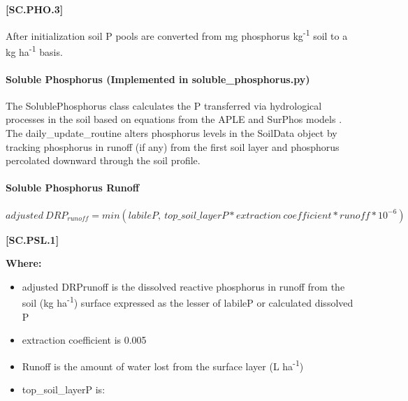             {\raggedleft \textbf{[SC.PHO.3]}\par}
            \vspace{0.5cm}

After initialization soil P pools are converted from mg phosphorus kg\textsuperscript{-1} soil to a kg ha\textsuperscript{-1} basis.

\paragraph{Soluble Phosphorus (Implemented in soluble\_phosphorus.py)}

The SolublePhosphorus class calculates the P transferred via hydrological processes in the soil based on equations from the APLE and SurPhos models \parencite{vadas2007}. The daily\_update\_routine alters phosphorus levels in the SoilData object by tracking phosphorus in runoff (if any) from the first soil layer and phosphorus percolated downward through the soil profile.
\vspace{0.2cm}

\paragraph{Soluble Phosphorus Runoff}
        \vspace{0.5cm}
            
    \begin{center}
\(adjusted\ DRP_{runoff}=min(labileP,\ top\_soil\_layerP * extraction\ coefficient * runoff * 10^{-6})\)

    \end{center}
        \vspace{0.5cm} 
    
            {\raggedleft \textbf{[SC.PSL.1]}\par}
            \vspace{0.5cm}

        \textbf{Where:}
            
        \begin{itemize}
            \item adjusted DRPrunoff is the dissolved reactive phosphorus in runoff from the soil (kg ha\textsuperscript{-1}) surface expressed as the lesser of labileP or calculated dissolved P
            \item extraction coefficient is 0.005
            \item Runoff is the amount of water lost from the surface layer (L ha\textsuperscript{-1})
            \item top\_soil\_layerP is:

        \end{itemize}
        \vspace{0.5cm}
            
